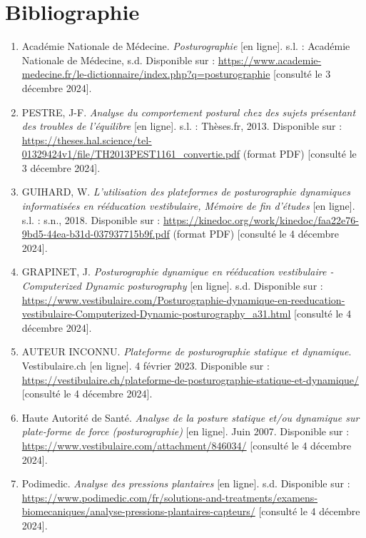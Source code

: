 
\section*{Bibliographie}

\begin{enumerate}
    \item  \label{source:1} Académie Nationale de Médecine. \emph{Posturographie} [en ligne]. s.l. : Académie Nationale de Médecine, s.d. Disponible sur : \url{https://www.academie-medecine.fr/le-dictionnaire/index.php?q=posturographie} [consulté le 3 décembre 2024].

    \item \label{source:2} PESTRE, J-F. \emph{Analyse du comportement postural chez des sujets présentant des troubles de l'équilibre} [en ligne]. s.l. : Thèses.fr, 2013. Disponible sur : \url{https://theses.hal.science/tel-01329424v1/file/TH2013PEST1161_convertie.pdf} (format PDF) [consulté le 3 décembre 2024].

    \item \label{source:3} GUIHARD, W. \emph{L'utilisation des plateformes de posturographie dynamiques informatisées en rééducation vestibulaire, Mémoire de fin d'études} [en ligne]. s.l. : s.n., 2018. Disponible sur : \url{https://kinedoc.org/work/kinedoc/faa22e76-9bd5-44ea-b31d-037937715b9f.pdf} (format PDF) [consulté le 4 décembre 2024].

    \item  \label{source:4} GRAPINET, J. \emph{Posturographie dynamique en rééducation vestibulaire - Computerized Dynamic posturography} [en ligne]. s.d. Disponible sur : \url{https://www.vestibulaire.com/Posturographie-dynamique-en-reeducation-vestibulaire-Computerized-Dynamic-posturography_a31.html} [consulté le 4 décembre 2024].

    \item \label{source:5} AUTEUR INCONNU. \emph{Plateforme de posturographie statique et dynamique}. Vestibulaire.ch [en ligne]. 4 février 2023. Disponible sur : \url{https://vestibulaire.ch/plateforme-de-posturographie-statique-et-dynamique/} [consulté le 4 décembre 2024].

    \item \label{source:6} Haute Autorité de Santé. \emph{Analyse de la posture statique et/ou dynamique sur plate-forme de force (posturographie)} [en ligne]. Juin 2007. Disponible sur : \url{https://www.vestibulaire.com/attachment/846034/} [consulté le 4 décembre 2024].

    \item \label{source:7} Podimedic. \emph{Analyse des pressions plantaires} [en ligne]. s.d. Disponible sur : \url{https://www.podimedic.com/fr/solutions-and-treatments/examens-biomecaniques/analyse-pressions-plantaires-capteurs/} [consulté le 4 décembre 2024].


\end{enumerate}
